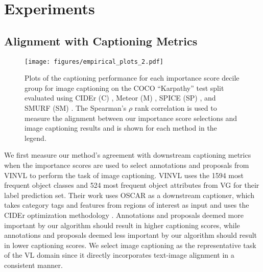 \documentclass[10pt,twocolumn,letterpaper]{article}
\begin{document}
\section{Experiments}
\subsection{Alignment with Captioning Metrics}
\begin{figure}[t]
\centering
\def\svgwidth{\columnwidth}
\texttt{[image: figures/empirical\_plots\_2.pdf]}
\caption{Plots of the captioning performance for each importance score decile group for image captioning on the COCO ``Karpathy'' test split \cite{coco2014,karp2015} evaluated using CIDEr (C) \cite{cider2015}, Meteor (M) \cite{meteor2005}, SPICE (SP) \cite{spice2016}, and SMURF (SM) \cite{smurf2021}. The Spearman's $\rho$ rank correlation is used to measure the alignment between our importance score selections and image captioning results and is shown for each method in the legend.}
\label{empirical}
\end{figure}
We first measure our method's agreement with downstream captioning metrics when the importance scores are used to select annotations and proposals from VINVL \cite{vinvl2021} to perform the task of image captioning. VINVL uses the 1594 most frequent object classes and 524 most frequent object attributes from VG for their label prediction set. Their work uses OSCAR \cite{oscar2020} as a downstream captioner, which takes category tags and features from regions of interest as input and uses the CIDEr optimization methodology \cite{cideropt2017}. Annotations and proposals deemed more important by our algorithm should result in higher captioning scores, while annotations and proposals deemed less important by our algorithm should result in lower captioning scores. We select image captioning as the representative task of the VL domain since it directly incorporates text-image alignment in a consistent manner. 
\par
\end{document}
